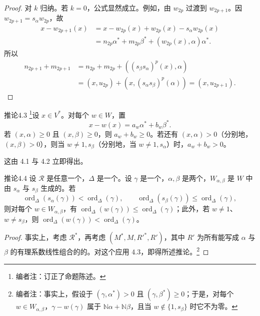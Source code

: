 \begin{proof}
对 $k$ 归纳。若 $k=0$，公式显然成立。例如，由 $w_{2p}$ 过渡到 $w_{2p+1}$。因 $w_{2p+1}=s_\alpha w_{2p}$，故
\begin{align*}
x-w_{2p+1}(x)&=x-w_{2p}(x)+w_{2p}(x)-s_\alpha w_{2p}(x)\\
&=n_{2p}\alpha^*+m_{2p}\beta^*+(w_{2p}(x),\alpha)\alpha^*.
\end{align*}
所以
\begin{align*}
n_{2p+1}+m_{2p+1}&=n_{2p}+m_{2p}+((s_\beta s_\alpha)^p(x),\alpha)\\
&=(x,u_{2p})+(x,(s_\alpha s_\beta)^p(\alpha))=(x,u_{2p+1}).
\end{align*}
\end{proof}

\begin{SGAresult}{推论}{4.3}
\footnote{编者注：订正了命题陈述。}设 $x\in V^*$。对每个 $w\in W$，置
\[x-w(x)=a_w\alpha^*+b_w\beta^*.\]
若 $(x,\alpha)\geq0$ 且 $(x,\beta)\geq0$，则 $a_w+b_w\geq0$。若还有 $(x,\alpha)>0$（分别地，$(x,\beta)>0$），则当 $w\ne1,s_\beta$（分别地，当 $w\ne1,s_\alpha$）时，$a_w+b_w>0$。
\end{SGAresult}
这由 4.1 与 4.2 立即得出。
\begin{SGAresult}{推论}{4.4}
设 $\mathscr R$ 是任意一个，$\Delta$ 是一个。设 $\gamma$ 是一个，$\alpha,\beta$ 是两个，$W_{\alpha,\beta}$ 是 $W$ 中由 $s_\alpha$ 与 $s_\beta$ 生成的。若
\[\operatorname{ord}_\Delta(s_\alpha(\gamma))<\operatorname{ord}_\Delta(\gamma),\qquad
\operatorname{ord}_\Delta(s_\beta(\gamma))\leq\operatorname{ord}_\Delta(\gamma),\]
则对每个 $w\in W_{\alpha,\beta}$，有 $\operatorname{ord}_\Delta(w(\gamma))\leq\operatorname{ord}_\Delta(\gamma)$；此外，若 $w\ne1$、$w\ne s_\beta$，则 $\operatorname{ord}_\Delta(w(\gamma))<\operatorname{ord}_\Delta(\gamma)$。
\end{SGAresult}
\begin{proof}
事实上，考虑 $\mathscr R^*$，再考虑 $(M^*,M,R'^*,R')$，其中 $R'$ 为所有能写成 $\alpha$ 与 $\beta$ 的有理系数线性组合的的。对这个应用 4.3，即得所述推论。\footnote{编者注：事实上，假设于 $(\gamma,\alpha^*)>0$ 且 $(\gamma,\beta^*)\geq0$；于是，对每个 $w\in W_{\alpha,\beta}$，$\gamma-w(\gamma)$ 属于 $\mathbb N\alpha+\mathbb N\beta$，且当 $w\notin\{1,s_\beta\}$ 时它不为零。}
\end{proof}
